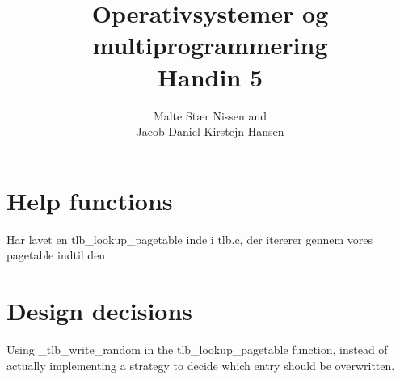 \documentclass[11pt,a4paper]{article}
\title{Operativsystemer og multiprogrammering \\ Handin 5}
\author{Malte Stær Nissen and \\
        Jacob Daniel Kirstejn Hansen}
\begin{document}
\maketitle

\tableofcontents
\newpage

\section{Help functions}

Har lavet en tlb\_lookup\_pagetable inde i tlb.c, der itererer gennem vores
pagetable indtil den

\section{Design decisions}

Using \_tlb\_write\_random in the tlb\_lookup\_pagetable function, instead of
actually implementing a strategy to decide which entry should be overwritten.
\end{document}
